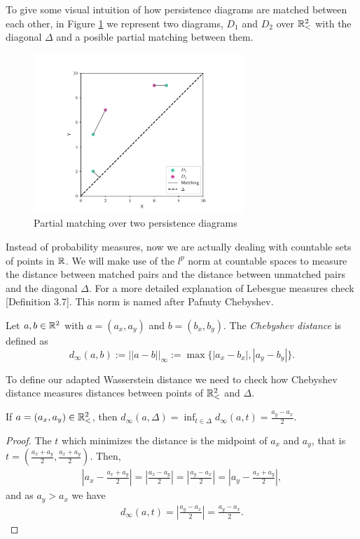 \begin{example}
    To give some visual intuition of how persistence diagrams are matched between each other, in Figure \ref{fig:1} we represent two diagrams, $ D_ 1 $ and $ D_2 $ over $ \mathbb{R}_<^2 $ with the diagonal $ \Delta $ and a posible partial matching between them.
    \begin{figure}[h] \label{fig:1}
        \centering
        \includegraphics[width=8cm]{Figures/figure-1.pdf}
        \caption{Partial matching over two persistence diagrams}
    \end{figure}
\end{example}

Instead of probability measures, now we are actually dealing with countable sets of points in $ \mathbb R $. We will make use of the $ l^p $ norm at countable spaces to measure the distance between matched pairs and the distance between unmatched pairs and the diagonal $ \Delta $. For a more detailed explanation of Lebesgue measures check \cite{rudin}[Definition 3.7]. This norm is named after Pafnuty Chebyshev.

\begin{definition}
    Let $ a, b \in \mathbb R^2 $ with $a = (a_x, a_y) $ and $ b = (b_x, b_y) $. The {\it Chebyshev distance} is defined as
    $$
        d_\infty(a, b) := ||a-b||_{\infty} := \max \{|a_x - b_x|, |a_y - b_y|\}.
    $$
\end{definition}

To define our adapted Wasserstein distance we need to check how Chebyshev distance measures distances between points of $ \mathbb{R}_<^2 $ and $ \Delta $.

\begin{proposition} \label{prop:distance-delta}
    If $ a = (a_x, a_y) \in \mathbb{R}_<^2 $, then $ d_\infty(a, \Delta) = \inf_{t \in \Delta} d_\infty(a, t) = \frac{a_y - a_x}{2} $.
\end{proposition}
\begin{proof}
    The $ t $ which minimizes the distance is the midpoint of $ a_x $ and $ a_y $, that is $t = \left(\frac{a_x+a_y}{2}, \frac{a_x+a_y}{2}\right)  $. Then,
    \begin{align*}
        \left| a_x - \frac{a_x+a_y}{2} \right| = \left| \frac{a_x-a_y}{2}\right| = \left| \frac{a_y-a_x}{2}\right| = \left| a_y - \frac{a_x+a_y}{2} \right|,
    \end{align*}
    and as $ a_y > a_x $ we have
    \begin{align*}
        d_\infty(a, t) = \left|\frac{a_y - a_x}{2}\right| = \frac{a_y - a_x}{2}.
    \end{align*}
\end{proof}

